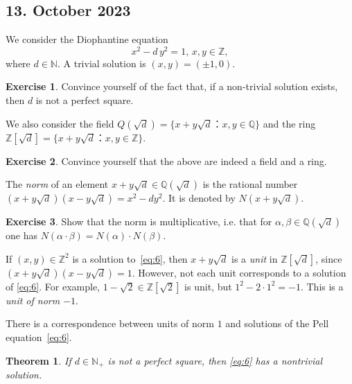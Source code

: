 \documentclass[a4paper,11pt,american]{article}
\theoremstyle{plain}
\newtheorem{theorem}{Theorem}
\theoremstyle{definition}
\newtheorem{exercise}{Exercise}
\begin{document}
\subsection*{13. October 2023}

We consider the Diophantine equation
\begin{equation}
  \label{eq:6}
  x^2 - d \,y^2  = 1, \, x,y ∈ℤ,
\end{equation}
where $d ∈ ℕ$. A trivial solution is $(x,y) = (\pm 1, 0)$.
\begin{exercise}
  \label{exe:1}
  Convince yourself of the fact that, if a non-trivial solution exists, then $d$ is not a perfect square. 
\end{exercise}

We also consider the field $Q(\sqrt{d}) = \{ x+ y \sqrt{d} ： x,y ∈ℚ \}$ and  the ring $ℤ[ \sqrt{d}] = \{ x+ y \sqrt{d} ： x,y ∈ℤ\}$.
\begin{exercise}
  \label{exe:2}
  Convince yourself that the above are indeed a field and a ring. 
\end{exercise}




The \emph{norm} of an element $x + y \sqrt{d} ∈ ℚ(\sqrt{d})$ is the rational number $(x + y \sqrt{d}) (x - y \sqrt{d} ) = x^2 -d y^2$. It is denoted by $N(x+y\sqrt{d})$. 
\begin{exercise}
  \label{exe:3}
  Show that the norm is multiplicative, i.e. that for $α,β ∈ℚ(\sqrt{d})$ one has $N(α⋅β) = N(α) ⋅N(β)$. 
\end{exercise}


If $(x,y) ∈ℤ^2$ is a solution to~\eqref{eq:6}, then $x + y \sqrt{d}$ is a \emph{unit} in $ℤ[ \sqrt{d}]$, since $(x + y \sqrt{d})(x - y \sqrt{d}) =1$. However, not each unit corresponds to a solution of \eqref{eq:6}. For example, $1 - \sqrt{2} ∈ℤ[\sqrt{2}]$ is  unit, but $1^2 - 2 ⋅ 1^2 = -1$. This is a \emph{unit of norm $-1$}.

There is a correspondence between units of norm $1$ and solutions of the Pell equation~\eqref{eq:6}. 



\begin{theorem}
  \label{thr:4}
  If $d ∈ ℕ_+$ is not a perfect square, then \eqref{eq:6} has a nontrivial solution. 
\end{theorem}
\end{document}

